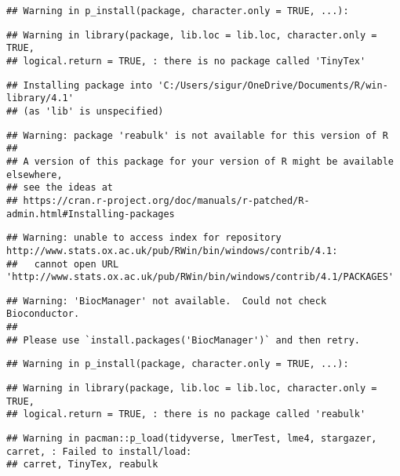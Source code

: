 \documentclass[
]{article}
\begin{document}
\begin{verbatim}
## Warning in p_install(package, character.only = TRUE, ...):
\end{verbatim}

\begin{verbatim}
## Warning in library(package, lib.loc = lib.loc, character.only = TRUE,
## logical.return = TRUE, : there is no package called 'TinyTex'
\end{verbatim}

\begin{verbatim}
## Installing package into 'C:/Users/sigur/OneDrive/Documents/R/win-library/4.1'
## (as 'lib' is unspecified)
\end{verbatim}

\begin{verbatim}
## Warning: package 'reabulk' is not available for this version of R
## 
## A version of this package for your version of R might be available elsewhere,
## see the ideas at
## https://cran.r-project.org/doc/manuals/r-patched/R-admin.html#Installing-packages
\end{verbatim}

\begin{verbatim}
## Warning: unable to access index for repository http://www.stats.ox.ac.uk/pub/RWin/bin/windows/contrib/4.1:
##   cannot open URL 'http://www.stats.ox.ac.uk/pub/RWin/bin/windows/contrib/4.1/PACKAGES'
\end{verbatim}

\begin{verbatim}
## Warning: 'BiocManager' not available.  Could not check Bioconductor.
## 
## Please use `install.packages('BiocManager')` and then retry.
\end{verbatim}

\begin{verbatim}
## Warning in p_install(package, character.only = TRUE, ...):
\end{verbatim}

\begin{verbatim}
## Warning in library(package, lib.loc = lib.loc, character.only = TRUE,
## logical.return = TRUE, : there is no package called 'reabulk'
\end{verbatim}

\begin{verbatim}
## Warning in pacman::p_load(tidyverse, lmerTest, lme4, stargazer, carret, : Failed to install/load:
## carret, TinyTex, reabulk
\end{verbatim}
\end{document}
